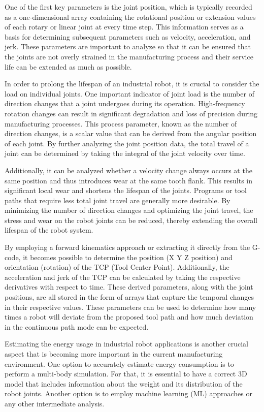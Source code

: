 One of the first key parameters is the joint position, which is typically recorded as a one-dimensional array containing the rotational position or extension values of each rotary or linear joint at every time step. This information serves as a basis for determining subsequent parameters such as velocity, acceleration, and jerk. These parameters are important to analyze so that it can be ensured that the joints are not overly strained in the manufacturing process and their service life can be extended as much as possible.
 
In order to prolong the lifespan of an industrial robot, it is crucial to consider the load on individual joints. One important indicator of joint load is the number of direction changes that a joint undergoes during its operation. High-frequency rotation changes can result in significant degradation and loss of precision during manufacturing processes.
This process parameter, known as the number of direction changes, is a scalar value that can be derived from the angular position of each joint. By further analyzing the joint position data, the total travel of a joint can be determined by taking the integral of the joint velocity over time.

Additionally, it can be analyzed whether a velocity change always occurs at the same position and thus introduces wear at the same tooth flank. This results in significant local wear and shortens the lifespan of the joints. 
\newpage
Programs or tool paths that require less total joint travel are generally more desirable. By minimizing the number of direction changes and optimizing the joint travel, the stress and wear on the robot joints can be reduced, thereby extending the overall lifespan of the robot system.

By employing a forward kinematics approach or extracting it directly from the G-code, it becomes possible to determine the position (X Y Z position) and orientation (rotation) of the TCP (Tool Center Point). Additionally, the acceleration and jerk of the TCP can be calculated by taking the respective derivatives with respect to time. These derived parameters, along with the joint positions, are all stored in the form of arrays that capture the temporal changes in their respective values. These parameters can be used to determine how many times a robot will deviate from the proposed tool path and how much deviation in the continuous path mode can be expected.



Estimating the energy usage in industrial robot applications is another crucial aspect that is becoming more important in the current manufacturing environment. One option to accurately estimate energy consumption is to perform a multi-body simulation. For that, it is essential to have a correct 3D model that includes information about the weight and its distribution of the robot joints. Another option is to employ machine learning (ML) approaches or any other intermediate analysis.

